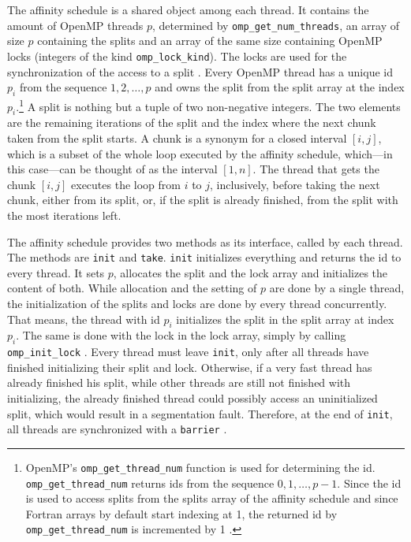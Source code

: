 \documentclass[twoside,11pt]{article}
\begin{document}
The affinity schedule is a shared object among each thread.
It contains the amount of OpenMP threads $p$, determined
by \texttt{omp\_get\_num\_threads}, an array of size $p$
containing the splits and an array of the same size
containing OpenMP locks (integers of the kind
\texttt{omp\_lock\_kind}).
The locks are used for the synchronization of the access
to a split \citep[see][Chapter 3]{omp}.
Every OpenMP thread has a unique id $p_i$ from the sequence
$1,2,\dots,p$ and owns the split from the split array at
the index $p_i$.\footnote{%
  OpenMP's \texttt{omp\_get\_thread\_num} function is used
  for determining the id.
  \texttt{omp\_get\_thread\_num} returns ids from the
  sequence $0,1,\dots,p-1$. Since the id is used to access
  splits from the splits array of the affinity schedule and
  since Fortran arrays by default start indexing at 1, the
  returned id by \texttt{omp\_get\_thread\_num} is
  incremented by 1 \citep[see][Chapter 3]{omp}.}
A split is nothing but a tuple of two non-negative
integers. The two elements are the remaining iterations of
the split and the index where the next chunk taken from the
split starts.
A chunk is a synonym for a closed interval $[i, j]$, which
is a subset of the whole loop executed by the affinity
schedule, which---in this case---can be thought of as the
interval $[1, n]$.
The thread that gets the chunk $[i, j]$ executes the loop
from $i$ to $j$, inclusively, before taking the next chunk,
either from its split, or, if the split is already
finished, from the split with the most iterations left.

The affinity schedule provides two methods as its
interface, called by each thread.
The methods are \texttt{init} and \texttt{take}.
\texttt{init} initializes everything and returns the id
to every thread.
It sets $p$, allocates the split and the lock array and
initializes the content of both.
While allocation and the setting of $p$ are done by a
single thread, the initialization of the splits and locks
are done by every thread concurrently.
That means, the thread with id $p_i$ initializes the split
in the split array at index $p_i$.
The same is done with the lock in the lock array, simply
by calling \texttt{omp\_init\_lock}
\citep[see][Chapter 3]{omp}.
Every thread must leave \texttt{init}, only after all
threads have finished initializing their split and lock.
Otherwise, if a very fast thread has already finished his
split, while other threads are still not finished with
initializing, the already finished thread could possibly
access an uninitialized split, which would result in a
segmentation fault.
Therefore, at the end of \texttt{init}, all threads are
synchronized with a \texttt{barrier}
\citep[see][Chapter 2]{omp}.
\end{document}
